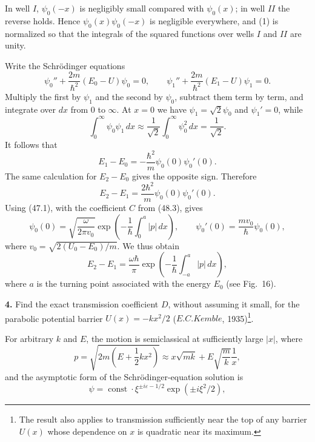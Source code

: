 In well $I$, $\psi_0(-x)$ is negligibly small compared with $\psi_0(x)$; in
well $II$ the reverse holds. Hence $\psi_0(x)\psi_0(-x)$ is negligible
everywhere, and (1) is normalized so that the integrals of the squared
functions over wells $I$ and $II$ are unity.

Write the Schrödinger equations
\[
 \psi_0''+\frac{2m}{\hbar^2}(E_0-U)\psi_0=0,\qquad
 \psi_1''+\frac{2m}{\hbar^2}(E_1-U)\psi_1=0.
\]
Multiply the first by $\psi_1$ and the second by $\psi_0$, subtract them term
by term, and integrate over $dx$ from 0 to $\infty$. At $x=0$ we have
$\psi_1=\sqrt2\psi_0$ and $\psi_1'=0$, while
\[
 \int_0^\infty\psi_0\psi_1\,dx\approx\frac1{\sqrt2}
 \int_0^\infty\psi_0^2\,dx=\frac1{\sqrt2}.
\]
It follows that
\[
 E_1-E_0=-\frac{\hbar^2}{m}\psi_0(0)\psi_0'(0).
\]
The same calculation for $E_2-E_0$ gives the opposite sign. Therefore
\[
 E_2-E_1=\frac{2\hbar^2}{m}\psi_0(0)\psi_0'(0).
\]
Using (47.1), with the coefficient $C$ from (48.3), gives
\[
 \psi_0(0)=\sqrt{\frac{\omega}{2\pi v_0}}
 \exp\left(-\frac1\hbar\int_0^a|p|\,dx\right),\qquad
 \psi_0'(0)=\frac{mv_0}{\hbar}\psi_0(0),
\]
where $v_0=\sqrt{2(U_0-E_0)/m}$. We thus obtain
\[
 E_2-E_1=\frac{\omega\hbar}{\pi}
 \exp\left(-\frac1\hbar\int_{-a}^a|p|\,dx\right),
\]
where $a$ is the turning point associated with the energy $E_0$ (see Fig.~16).

\textbf{4.} Find the exact transmission coefficient $D$, without assuming it
small, for the parabolic potential barrier $U(x)=-kx^2/2$ ($E. C. Kemble$,
1935)\footnote{The result also applies to transmission sufficiently near the
top of any barrier $U(x)$ whose dependence on $x$ is quadratic near its
maximum.}.

\SolutionHeading For arbitrary $k$ and $E$, the motion is semiclassical at
sufficiently large $|x|$, where
\[
 p=\sqrt{2m\left(E+\frac12kx^2\right)}\approx x\sqrt{mk}
 +E\sqrt{\frac mk}\frac1x,
\]
and the asymptotic form of the Schrödinger-equation solution is
\[
 \psi=\operatorname{const}\cdot\xi^{\pm i\varepsilon-1/2}
 \exp(\pm i\xi^2/2),
\]

